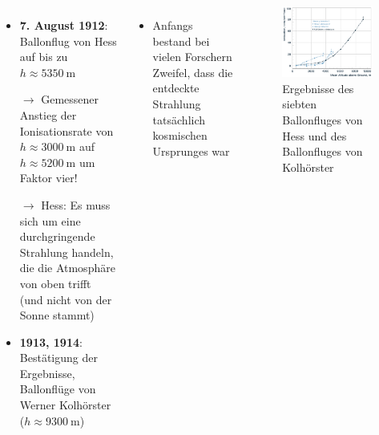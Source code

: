\documentclass[aspectratio=1610, professionalfonts, 9pt, hyperref={colorlinks=false}]{beamer}
\begin{document}
\begin{frame}{}
  \begin{columns}
      \begin{itemize}
        \setlength\itemsep{0.5em}
        \item \textbf{7. August 1912}: Ballonflug von Hess auf bis zu $h \approx \SI{5350}{\metre}$
        \item [$\rightarrow$] Gemessener Anstieg der Ionisationsrate von $h \approx \SI{3000}{\metre}$ auf $h \approx \SI{5200}{\metre}$ um Faktor vier!
        \item [$\rightarrow$] Hess: Es muss sich um eine durchgringende Strahlung handeln, die die Atmosphäre von oben trifft (und nicht von der Sonne stammt)
        \item \textbf{1913, 1914}: Bestätigung der Ergebnisse, Ballonflüge von Werner Kolhörster ($h \approx \SI{9300}{\metre}$)
      \end{itemize}


      \begin{itemize}
        \item Anfangs bestand bei vielen Forschern Zweifel, dass die entdeckte Strahlung tatsächlich kosmischen Ursprunges war
      \end{itemize}


      \begin{figure}
          \centering
          \includegraphics[width=\linewidth]{images/walter2.png}
          \caption{Ergebnisse des siebten Ballonfluges von Hess und des Ballonfluges von Kolhörster \cite{Hess:2018twh}}
      \end{figure}
  \end{columns}
\end{frame}
\end{document}
